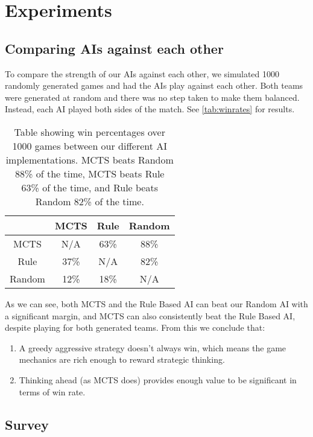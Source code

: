 \chapter{Experiments}
\label{chapter05}

\section{Comparing AIs against each other}

To compare the strength of our AIs against each other, we simulated 1000 randomly generated games
and had the AIs play against each other. Both teams were generated at random and there was no step taken
to make them balanced. Instead, each AI played both sides of the match. See \autoref{tab:winrates} for results.

\begin{table}[h]
	\centering
	\begin{tabular}{|| c | c c c ||}
		\hline
		& MCTS & Rule & Random \\
		\hline\hline
		MCTS & N/A & 63\% & 88\% \\
		Rule & 37\%& N/A & 82\% \\
		Random & 12\% & 18\% & N/A \\
		\hline
	\end{tabular}
	\caption{Table showing win percentages over 1000 games between our different AI implementations.
	MCTS beats Random 88\% of the time, MCTS beats Rule 63\% of the time, and Rule beats Random 82\% of the time.}
	\label{tab:winrates}
\end{table}

As we can see, both MCTS and the Rule Based AI can beat our Random AI with a significant margin,
and MCTS can also consistently beat the Rule Based AI, despite playing for both generated teams.
From this we conclude that:

\begin{enumerate}
	\item A greedy aggressive strategy doesn't always win, which means the game mechanics are rich enough
	to reward strategic thinking.
	\item Thinking ahead (as MCTS does) provides enough value to be significant in terms of win rate.
\end{enumerate}

\section{Survey}
\label{survey}

